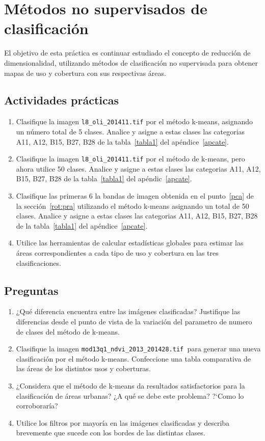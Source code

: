 \documentclass[hidelinks,12pt]{article}
\begin{document}
\section{Métodos no supervisados de clasificación}

El objetivo de esta práctica es continuar estudiado el concepto de reducción de
dimensionalidad, utilizando métodos de clasificación no supervisada para obtener
mapas de uso y cobertura con sus respectivas áreas.

\subsection{Actividades pr\'acticas}
\begin{enumerate}
    \item Clasifique la imagen \texttt{l8\_oli\_2014\-11.tif} por el método 
        k-means, asignando un número total
        de 5 clases. Analice y asigne a estas clases las categorias A11, A12,
        B15, B27, B28 de la tabla~\ref{tabla1} del ap\'endice~\ref{apcate}.
    \item Clasifique la imagen \texttt{l8\_oli\_2014\-11.tif} por el método de 
        k-means, pero ahora utilice 50
        clases. Analice y asigne a estas clases las categorias A11, A12,
        B15, B27, B28 de la tabla~\ref{tabla1} del ap\'endic~\ref{apcate}.
    \item Clasifique las primeras 6 la bandas de imagen obtenida en el punto~\ref{pca} 
        de la secci\'on~\ref{rot:pra} utilizando el m\'etodo k-means
        asignando un total de 50 clases. Analice y asigne a estas clases las categorias A11, A12,
        B15, B27, B28 de la tabla~\ref{tabla1} del ap\'endice~\ref{apcate}.
    \item Utilice las herramientas de calcular estadísticas globales para
        estimar las áreas correspondientes a cada tipo de uso y cobertura en
        las tres clasificaciones.
\end{enumerate}

\subsection{Preguntas}
\begin{enumerate}
    \item ¿Qué diferencia encuentra entre las imágenes clasificadas? Justifique
        las diferencias desde el punto de vista de la variaci\'on del parametro
        de numero de clases del método de k-means.
    \item Clasifique la imagen  \texttt{mod13q1\_ndvi\_2013\_2014\-28.tif }para 
        generar una nueva clasificación por el método k-means. Confeccione una 
        tabla comparativa de las áreas de los distintos usos y coberturas.
    \item ¿Considera que el método de k-means da resultados satisfactorios para
        la clasificación de áreas urbanas? ¿A qué se debe este problema? ?`Como
        lo corroborar\'ia?
    \item Utilice los filtros por mayoría en las imágenes clasificadas y
        describa brevemente que sucede con los bordes de las distintas clases.
\end{enumerate}
\end{document}
